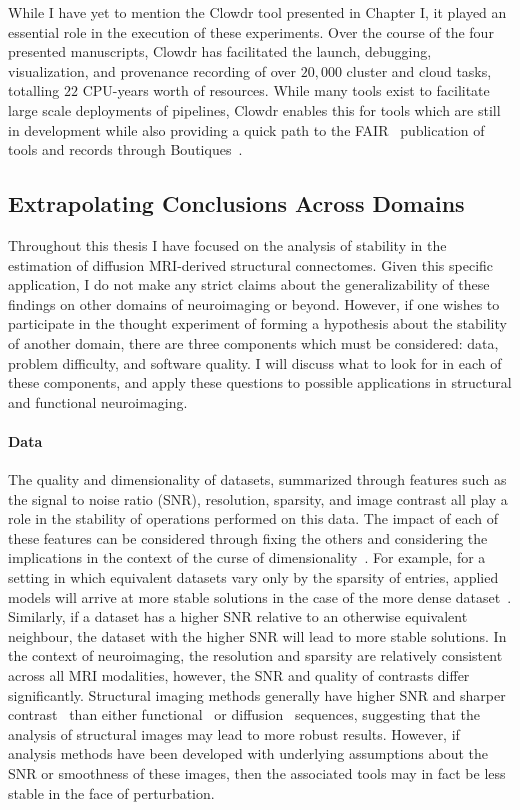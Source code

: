 While I have yet to mention the Clowdr tool presented in Chapter I, it played an essential role in the execution of
these experiments. Over the course of the four presented manuscripts, Clowdr has facilitated the launch, debugging,
visualization, and provenance recording of over $20,000$ cluster and cloud tasks, totalling $22$ CPU-years worth of
resources. While many tools exist to facilitate large scale deployments of pipelines, Clowdr enables this for tools
which are still in development while also providing a quick path to the FAIR~\cite{wilkinson2016fair} publication of
tools and records through Boutiques~\cite{Glatard2018-tu}.

\subsection{Extrapolating Conclusions Across Domains}

Throughout this thesis I have focused on the analysis of stability in the estimation of diffusion MRI-derived
structural connectomes. Given this specific application, I do not make any strict claims about the generalizability
of these findings on other domains of neuroimaging or beyond. However, if one wishes to participate in the thought
experiment of forming a hypothesis about the stability of another domain, there are three components which must
be considered: data, problem difficulty, and software quality. I will discuss what to look for in each of these
components, and apply these questions to possible applications in structural and functional neuroimaging.

\paragraph*{Data}
The quality and dimensionality of datasets, summarized through features such as the signal to noise ratio (SNR),
resolution, sparsity, and image contrast all play a role in the stability of operations performed on this data. The
impact of each of these features can be considered through fixing the others and considering the implications in the
context of the curse of dimensionality~\cite{friedman1997bias}. For example, for a setting in which equivalent
datasets vary only by the sparsity of entries, applied models will arrive at more stable solutions in the case of
the more dense dataset~\cite{geman1992neural}. Similarly, if a dataset has a higher SNR relative to an otherwise
equivalent neighbour, the dataset with the higher SNR will lead to more stable solutions. In the context of
neuroimaging, the resolution and sparsity are relatively consistent across all MRI modalities, however, the SNR and
quality of contrasts differ significantly. Structural imaging methods generally have higher SNR and sharper
contrast~\cite{bergamino2014review,chavhan2009principles} than either functional~\cite{logothetis2004nature} or
diffusion~\cite{thomason2011diffusion} sequences, suggesting that the analysis of structural images may lead to more
robust results. However, if analysis methods have been developed with underlying assumptions about the SNR or
smoothness of these images, then the associated tools may in fact be less stable in the face of perturbation.

